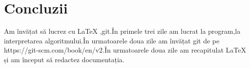 \chapter{Concluzii}
Am învățat să lucrez cu \LaTeX{} ,git.În primele trei zile am lucrat la program,la interpretarea algoritmului.În urmatoarele doua zile am învățat git de pe https://git-scm.com/book/en/v2.În urmatoarele doua zile am recapitulat \LaTeX{} și am început să redactez documentația.
\nocite{Git} 
